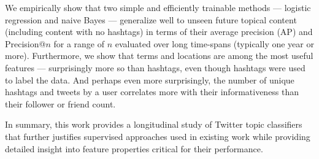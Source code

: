 We empirically show that two simple and efficiently trainable methods ---
logistic regression and naive Bayes --- generalize well to unseen
future topical content (including content with no hashtags) in terms
of their average precision (AP) and Precision@$n$ for a range of
$n$ evaluated over long time-spans (typically one year or more).  
Furthermore, we show that terms and locations are among the most
useful features --- surprisingly more so than hashtags, even though
hashtags were used to label the data.  And perhaps even more
surprisingly, the number of unique hashtags and tweets by a user
correlates more with their informativeness than their follower or
friend count.  

In summary, this work provides a longitudinal study of Twitter topic classifiers that further justifies supervised approaches used in existing work while providing detailed insight into feature properties critical for their performance.


%
%
